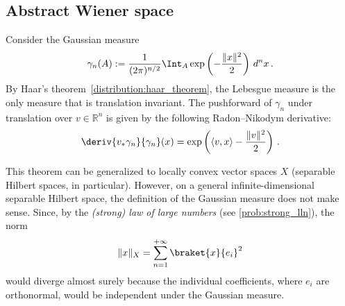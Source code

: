 

\subsection{Abstract Wiener space}

    \begin{theorem}\label{stoch:cameron_martin}
        Consider the Gaussian measure
        \begin{gather}
            \gamma_n(A) := \frac{1}{(2\pi)^{n/2}}\Int_A\exp\left(-\frac{\|x\|^2}{2}\right)\,d^nx\,.
        \end{gather}
        By Haar's theorem~\ref{distribution:haar_theorem}, the Lebesgue measure is the only measure that is translation invariant. The pushforward of $\gamma_n$ under translation over $v\in\mathbb{R}^n$ is given by the following Radon--Nikodym derivative:
        \begin{gather}
            \deriv{v_*\gamma_n}{\gamma_n}(x) = \exp\left(\langle v,x \rangle - \frac{\|v\|^2}{2}\right)\,.
        \end{gather}
    \end{theorem}

    This theorem can be generalized to locally convex vector spaces $X$ (separable Hilbert spaces, in particular). However, on a general infinite-dimensional separable Hilbert space, the definition of the Gaussian measure does not make sense. Since, by the \textit{(strong) law of large numbers} (see \cref{prob:strong_lln}), the norm
    \begin{gather}
        \|x\|_X = \sum_{n=1}^{+\infty}\braket{x}{e_i}^2
    \end{gather}
    would diverge almost surely because the individual coefficients, where $e_i$ are orthonormal, would be independent under the Gaussian measure.

